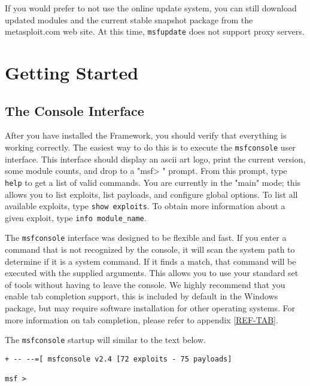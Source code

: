 \documentclass{report}
\begin{document}
\par
If you would prefer to not use the online update system, you can still download
updated modules and the current stable snapshot package from the metasploit.com
web site. At this time, \texttt{msfupdate} does not support proxy servers.
\pagebreak


\chapter{Getting Started}

    \section{The Console Interface}
    \label{STARTED-CONSOLE}
\par
After you have installed the Framework, you should verify that everything is
working correctly.  The easiest way to do this is to execute the
\texttt{msfconsole} user interface. This interface should display an ascii art
logo, print the current version, some module counts, and
drop to a "msf> " prompt. From this prompt, type \texttt{help} to get a list of
valid commands. You are currently in the "main" mode; this allows you to list
exploits, list payloads, and configure global options.  To list all available
exploits, type \texttt{show exploits}. To obtain more information about a given
exploit, type \texttt{info module\_name}. 

\par
The \texttt{msfconsole} interface was designed to be flexible and fast. If you
enter a command that is not recognized by the console, it will scan the system
path to determine if it is a system command. If it finds a match, that
command will be executed with the supplied arguments. This allows you to use
your standard set of tools without having to leave the console. We highly
recommend that you enable tab completion support, this is included by default in
the Windows package, but may require software installation for other operating
systems. For more information on tab completion, please refer to appendix
\ref{REF-TAB}.

\par
The \texttt{msfconsole} startup will similar to the text below.

\begin{verbatim}
+ -- --=[ msfconsole v2.4 [72 exploits - 75 payloads]

msf > 
\end{verbatim}
\end{document}
